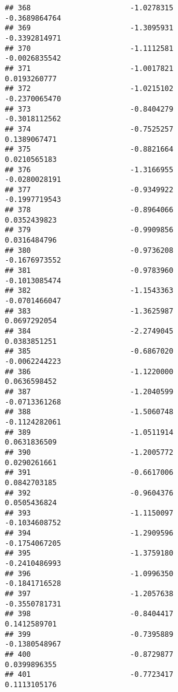 \documentclass[
]{article}
\begin{document}
\begin{verbatim}
## 368                       -1.0278315                         -0.3689864764
## 369                       -1.3095931                         -0.3392814971
## 370                       -1.1112581                         -0.0026835542
## 371                       -1.0017821                          0.0193260777
## 372                       -1.0215102                         -0.2370065470
## 373                       -0.8404279                         -0.3018112562
## 374                       -0.7525257                          0.1389067471
## 375                       -0.8821664                          0.0210565183
## 376                       -1.3166955                         -0.0280028191
## 377                       -0.9349922                         -0.1997719543
## 378                       -0.8964066                          0.0352439823
## 379                       -0.9909856                          0.0316484796
## 380                       -0.9736208                         -0.1676973552
## 381                       -0.9783960                         -0.1013085474
## 382                       -1.1543363                         -0.0701466047
## 383                       -1.3625987                          0.0697292054
## 384                       -2.2749045                          0.0383851251
## 385                       -0.6867020                         -0.0062244223
## 386                       -1.1220000                          0.0636598452
## 387                       -1.2040599                         -0.0713361268
## 388                       -1.5060748                         -0.1124282061
## 389                       -1.0511914                          0.0631836509
## 390                       -1.2005772                          0.0290261661
## 391                       -0.6617006                          0.0842703185
## 392                       -0.9604376                          0.0505436824
## 393                       -1.1150097                         -0.1034608752
## 394                       -1.2909596                         -0.1754067205
## 395                       -1.3759180                         -0.2410486993
## 396                       -1.0996350                         -0.1841716528
## 397                       -1.2057638                         -0.3550781731
## 398                       -0.8404417                          0.1412589701
## 399                       -0.7395889                         -0.1380548967
## 400                       -0.8729877                          0.0399896355
## 401                       -0.7723417                          0.1113105176

\end{verbatim}
\end{document}
